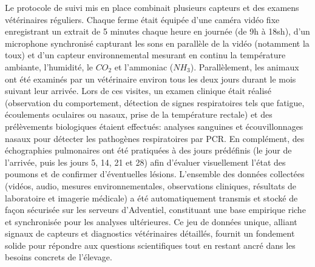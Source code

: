 Le protocole de suivi mis en place combinait plusieurs capteurs et des examens vétérinaires réguliers. Chaque ferme était équipée d’une caméra vidéo fixe enregistrant un extrait de 5 minutes chaque heure en journée (de 9h à 18sh), d’un microphone synchronisé capturant les sons en parallèle de la vidéo (notamment la toux) et d’un capteur environnemental mesurant en continu la température ambiante, l’humidité, le $CO_2$ et l’ammoniac ($NH_3$). Parallèlement, les animaux ont été examinés par un vétérinaire environ tous les deux jours durant le mois suivant leur arrivée. Lors de ces visites, un examen clinique était réalisé (observation du comportement, détection de signes respiratoires tels que fatigue, écoulements oculaires ou nasaux, prise de la température rectale) et des prélèvements biologiques étaient effectués: analyses sanguines et écouvillonnages nasaux pour détecter les pathogènes respiratoires par PCR. En complément, des échographies pulmonaires ont été pratiquées à des jours prédéfinis (le jour de l’arrivée, puis les jours 5, 14, 21 et 28) afin d’évaluer visuellement l’état des poumons et de confirmer d’éventuelles lésions. L’ensemble des données collectées (vidéos, audio, mesures environnementales, observations cliniques, résultats de laboratoire et imagerie médicale) a été automatiquement transmis et stocké de façon sécurisée sur les serveurs d’Adventiel, constituant une base empirique riche et synchronisée pour les analyses ultérieures. Ce jeu de données unique, alliant signaux de capteurs et diagnostics vétérinaires détaillés, fournit un fondement solide pour répondre aux questions scientifiques tout en restant ancré dans les besoins concrets de l’élevage.

